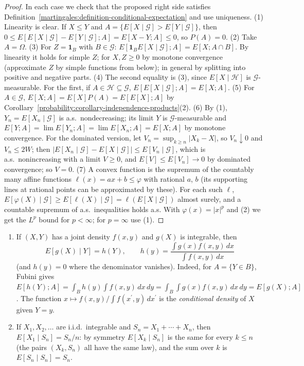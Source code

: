 \begin{proof}
In each case we check that the proposed right side satisfies Definition~\ref{martingales:definition-conditional-expectation} and use uniqueness.
(1) Linearity is clear. If $X \leq Y$ and $A = \{E[X \mid \mathcal{G}] > E[Y \mid \mathcal{G}]\}$, then $0 \leq E[E[X \mid \mathcal{G}] - E[Y \mid \mathcal{G}]; A] = E[X - Y; A] \leq 0$, so $P(A) = 0$.
(2) Take $A = \Omega$.
(3) For $Z = \mathbf{1}_B$ with $B \in \mathcal{G}$: $E[\mathbf{1}_BE[X \mid \mathcal{G}]; A] = E[X; A \cap B]$. By linearity it holds for simple $Z$; for $X, Z \geq 0$ by monotone convergence (approximate $Z$ by simple functions from below);
in general by splitting into positive and negative parts.
(4) The second equality is (3), since $E[X \mid \mathcal{H}]$ is $\mathcal{G}$-measurable. For the first, if $A \in \mathcal{H} \subseteq \mathcal{G}$, $E[E[X \mid \mathcal{G}]; A] = E[X; A]$.
(5) For $A \in \mathcal{G}$, $E[X; A] = E[X]P(A) = E[E[X]; A]$ by Corollary~\ref{probability:corollary-independence-products}(2).
(6) By (1), $Y_n = E[X_n \mid \mathcal{G}]$ is a.s.\ nondecreasing; its limit $Y$ is $\mathcal{G}$-measurable and $E[Y; A] = \lim E[Y_n; A] = \lim E[X_n; A] = E[X; A]$ by monotone convergence. For the dominated version, let
$V_n = \sup_{k \geq n}|X_k - X|$, so $V_n \downarrow 0$ and $V_n \leq 2W$; then $|E[X_n \mid \mathcal{G}] - E[X \mid \mathcal{G}]| \leq E[V_n \mid \mathcal{G}]$, which is a.s.\ nonincreasing with a limit $V \geq 0$, and $E[V] \leq E[V_n] \to 0$ by
dominated convergence; so $V = 0$.
(7) A convex function is the supremum of the countably many affine functions $\ell(x) = ax + b \leq \varphi$ with rational $a$, $b$ (its supporting lines at rational points can be approximated by these). For each such $\ell$,
$E[\varphi(X) \mid \mathcal{G}] \geq E[\ell(X) \mid \mathcal{G}] = \ell(E[X \mid \mathcal{G}])$ almost surely, and a countable supremum of a.s.\ inequalities holds a.s. With $\varphi(x) = |x|^p$ and (2) we get the $L^p$ bound for $p < \infty$;
for $p = \infty$ use (1).
\end{proof}

\begin{example}\label{martingales:example-conditional-density}
\begin{enumerate}
\item If $(X, Y)$ has a joint density $f(x, y)$ and $g(X)$ is integrable, then
\[
E[g(X) \mid Y] = h(Y), \qquad h(y) = \frac{\int g(x)f(x, y)\,dx}{\int f(x, y)\,dx}
\]
(and $h(y) = 0$ where the denominator vanishes). Indeed, for $A = \{Y \in B\}$, Fubini gives $E[h(Y); A] = \int_B h(y)\int f(x, y)\,dx\,dy = \int_B\int g(x)f(x, y)\,dx\,dy = E[g(X); A]$. The function
$x \mapsto f(x, y)/\int f(x^{\prime}, y)\,dx^{\prime}$ is the \emph{conditional density} of $X$ given $Y = y$.
\item If $X_1, X_2, \ldots$ are i.i.d.\ integrable and $S_n = X_1 + \cdots + X_n$, then $E[X_1 \mid S_n] = S_n/n$: by symmetry $E[X_k \mid S_n]$ is the same for every $k \leq n$ (the pairs $(X_k, S_n)$ all have the same law), and the sum
over $k$ is $E[S_n \mid S_n] = S_n$.
\end{enumerate}
\end{example}

